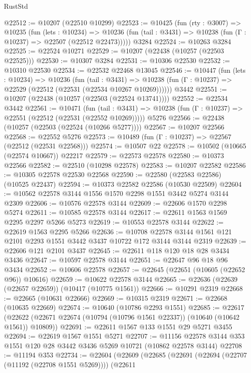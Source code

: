 \begin{lexlean}{RustStd}
\begin{coremodule}
@22512 := @10207 (@22510 @10299)
@22523 := @10425
    (fun (rty : @3007) =>
    @10235
      (fun (lets : @10234) =>
      @10236 (fun (tail : @3431) => @10238 (fun (Γ : @10237) => @22507 (@22512 @22473)))))
    @3284
@22524 := @10263 @3284
@22525 := @22524 @10271
@22529 := @10207 (@22438 (@10257 (@22503 @22525)))
@22530 := @10307 @3284
@22531 := @10306 @22530
@22532 := @10310 @22530
@22534 := @22532 @22468 @13045
@22546 := @10447
    (fun (lets : @10234) =>
    @10236
      (fun (tail : @3431) =>
      @10238 (fun (Γ : @10237) => @22529 (@22512 (@22531 (@22534 @10267 @10269))))))
    @3442
@22551 := @10207 (@22438 (@10257 (@22503 (@22524 @13741))))
@22552 := @22534 @3442
@22561 := @10471
    (fun (tail : @3431) => @10238 (fun (Γ : @10237) => @22551 (@22512 (@22531 (@22552 @10269)))))
    @5276
@22566 := @22438 (@10257 (@22503 (@22524 (@10266 @5277))))
@22567 := @10207 @22566
@22568 := @22552 @5276
@22573 := @10489 (fun (Γ : @10237) => @22567 (@22512 (@22531 @22568)))
@22574 := @10507 @22
@22578 := @10502 (@10665 (@22574 @10667)) @22217
@22579 := @22573 @22578
@22580 := @10373 @22566
@22582 := @22510 (@10298 @22578)
@22583 := @10207 @22582
@22586 := @10305 @22578 @22530 @22568
@22590 := @22580 (@22583 @22586) (@10525 @22437)
@22594 := @10373 @22582 @22586 (@10530 @22509)
@22604 := @10562 @22578 @3144 @1556 @1570 @2298 @1551 @3442 @5274 @3144 @2309
@22606 := @10576 @22578 @3144
@22609 := @22606 @1570 @2298 @5274
@22611 := @10585 @22578 @3144
@22617 := @22611 @1563 @1569 @2295 @2297 @5266 @5273
@22619 := @10553 @22578 @3144
@22622 := @22619 @1563 @2295 @5266
@22636 := @10708 @22578 @3144 @1561 @121 @2101 @2293 @1551 @3442 @3437 @10722 @172 @3144 @3144 @2319
@22639 := @22606 @121 @2101 @3437
@22645 := @22611 @118 @120 @18 @28 @3434 @3436
@22647 := @10597 @22578 @3144
@22651 := @22647 @96 @18 @96 @3434
@22652 := @10606 @22578
@22657 := @22645 (@22651 (@10605 (@22652 @96)) @10616)
@22659 := @10622 @22578 @3144
@22665 := @22636 (@22639 (@22657 @22659)) (@10417 (@10775 @1561))
@22666 := @10291 @2319
@22668 := @22665 (@10631 @22666)
@22669 := @10315 @2319
@22671 := @22668 (@10635 @22669)
@22674 := @10640 (@10786 @2293 @1551)
@22685 := @22617
    (@22622 (@22671 @22674 (@10794 (@10796 @1561 @22337)) (@10640 (@10642 @1561)) @10809))
@22691 := @22611 @1567 @133 @1551 @29 @5271 @3455
@22694 := @22619 @1567 @1551 @5271
@22707 := @11156 @22578 @3144 @353 @1551 @120 @28 @3442 @3436 @5269 @10721 (@10862 @22578 @3144)
@22708 := @11194 @353
@22734 := @22604
    (@22609
      (@22685
        (@22691
          (@22694 (@22707 (@11192 (@22708 @1551 @5269))))
          (@22611

\end{coremodule}
\end{lexlean}
